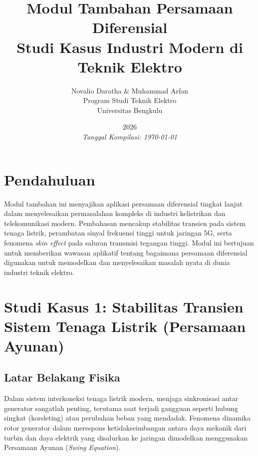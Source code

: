 \documentclass[12pt,a4paper]{article}
\title{Modul Tambahan Persamaan Diferensial\\Studi Kasus Industri Modern di Teknik Elektro}
\author{Novalio Daratha \& Muhammad Arfan\\Program Studi Teknik Elektro\\Universitas Bengkulu}
\date{2026 \\ \vspace{2mm}\small\textit{Tanggal Kompilasi: \today}}
\theoremstyle{definition}
\begin{document}
\maketitle

\tableofcontents

\newpage

\section{Pendahuluan}
Modul tambahan ini menyajikan aplikasi persamaan diferensial tingkat lanjut dalam menyelesaikan permasalahan kompleks di industri kelistrikan dan telekomunikasi modern. Pembahasan mencakup stabilitas transien pada sistem tenaga listrik, perambatan sinyal frekuensi tinggi untuk jaringan 5G, serta fenomena \textit{skin effect} pada saluran transmisi tegangan tinggi. Modul ini bertujuan untuk memberikan wawasan aplikatif tentang bagaimana persamaan diferensial digunakan untuk memodelkan dan menyelesaikan masalah nyata di dunia industri teknik elektro.

\section{Studi Kasus 1: Stabilitas Transien Sistem Tenaga Listrik (Persamaan Ayunan)}

\subsection{Latar Belakang Fisika}
Dalam sistem interkoneksi tenaga listrik modern, menjaga sinkronisasi antar generator sangatlah penting, terutama saat terjadi gangguan seperti hubung singkat (korsleting) atau perubahan beban yang mendadak. Fenomena dinamika rotor generator dalam merespons ketidakseimbangan antara daya mekanik dari turbin dan daya elektrik yang disalurkan ke jaringan dimodelkan menggunakan Persamaan Ayunan (\textit{Swing Equation}).
\end{document}
